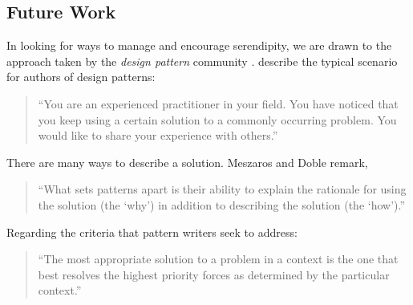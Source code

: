 \subsection{Future Work} \label{sec:futurework} \label{sec:hatching}

In looking for ways to manage and encourage serendipity, we are drawn
to the approach taken by the \emph{design pattern} community
\cite{alexander1999origins}.
 describe the typical scenario for authors of design
patterns:
\begin{quote}
\noindent ``You are an experienced practitioner in your field.  You
have noticed that you keep using a certain solution to a commonly
occurring problem.  You would like to share your experience with
others.''
\end{quote}
There are many ways to describe a solution.
Meszaros and Doble remark,
\begin{quote}
\noindent ``What sets patterns apart is their ability to explain the
rationale for using the solution (the `why') in addition to describing
the solution (the `how').''
\end{quote}
Regarding the criteria that pattern writers seek to address: 
\begin{quote}
\noindent ``The most appropriate solution to a problem in a context is
the one that best resolves the highest priority forces as determined
by the particular context.''
\end{quote}

